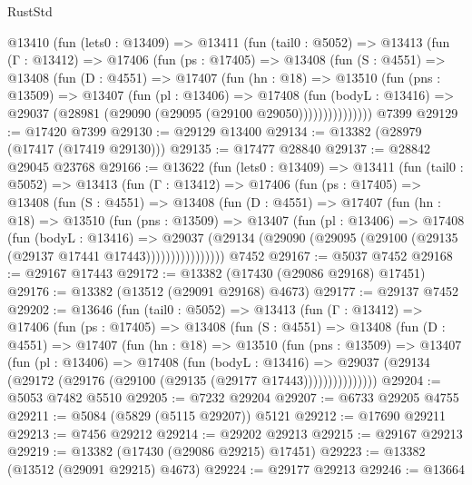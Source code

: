 \begin{lexlean}{RustStd}
\begin{coremodule}
    @13410
      (fun (lets0 : @13409) =>
      @13411
        (fun (tail0 : @5052) =>
        @13413
          (fun (Γ : @13412) =>
          @17406
            (fun (ps : @17405) =>
            @13408
              (fun (S : @4551) =>
              @13408
                (fun (D : @4551) =>
                @17407
                  (fun (hn : @18) =>
                  @13510
                    (fun (pns : @13509) =>
                    @13407
                      (fun (pl : @13406) =>
                      @17408
                        (fun (bodyL : @13416) =>
                        @29037 (@28981 (@29090 (@29095 (@29100 @29050)))))))))))))))
    @7399
@29129 := @17420 @7399
@29130 := @29129 @13400
@29134 := @13382 (@28979 (@17417 (@17419 @29130)))
@29135 := @17477 @28840
@29137 := @28842 @29045 @23768
@29166 := @13622
    (fun (lets0 : @13409) =>
    @13411
      (fun (tail0 : @5052) =>
      @13413
        (fun (Γ : @13412) =>
        @17406
          (fun (ps : @17405) =>
          @13408
            (fun (S : @4551) =>
            @13408
              (fun (D : @4551) =>
              @17407
                (fun (hn : @18) =>
                @13510
                  (fun (pns : @13509) =>
                  @13407
                    (fun (pl : @13406) =>
                    @17408
                      (fun (bodyL : @13416) =>
                      @29037
                        (@29134
                          (@29090 (@29095 (@29100 (@29135 (@29137 @17441 @17443))))))))))))))))
    @7452
@29167 := @5037 @7452
@29168 := @29167 @17443
@29172 := @13382 (@17430 (@29086 @29168) @17451)
@29176 := @13382 (@13512 (@29091 @29168) @4673)
@29177 := @29137 @7452
@29202 := @13646
    (fun (tail0 : @5052) =>
    @13413
      (fun (Γ : @13412) =>
      @17406
        (fun (ps : @17405) =>
        @13408
          (fun (S : @4551) =>
          @13408
            (fun (D : @4551) =>
            @17407
              (fun (hn : @18) =>
              @13510
                (fun (pns : @13509) =>
                @13407
                  (fun (pl : @13406) =>
                  @17408
                    (fun (bodyL : @13416) =>
                    @29037 (@29134 (@29172 (@29176 (@29100 (@29135 (@29177 @17443)))))))))))))))
@29204 := @5053 @7482 @5510
@29205 := @7232 @29204
@29207 := @6733 @29205 @4755
@29211 := @5084 (@5829 (@5115 @29207)) @5121
@29212 := @17690 @29211
@29213 := @7456 @29212
@29214 := @29202 @29213
@29215 := @29167 @29213
@29219 := @13382 (@17430 (@29086 @29215) @17451)
@29223 := @13382 (@13512 (@29091 @29215) @4673)
@29224 := @29177 @29213
@29246 := @13664

\end{coremodule}
\end{lexlean}
